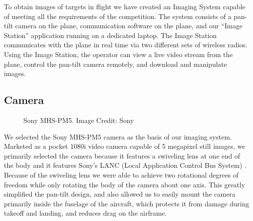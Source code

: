 \documentclass[pdftex,10pt,letter]{article}
\begin{document}
To obtain images of targets in flight we have created an Imaging System capable of meeting all the requirements of the competition.  The system consists of a pan-tilt camera on the plane, communication software on the plane, and our ``Image Station'' application running on a dedicated laptop.  The Image Station communicates with the plane in real time via two different sets of wireless radios.  Using the Image Station, the operator can view a live video stream from the plane, control the pan-tilt camera remotely, and download and manipulate images.

\subsection{Camera}

\begin{figure} [h!]
	\centering
	\caption{Sony MHS-PM5. Image Credit: Sony}
	\label{fig:camera}
\end{figure}

We selected the Sony MHS-PM5 camera as the basis of our imaging system. Marketed as a pocket 1080i video camera capable of 5 megapixel still images, we primarily selected the camera because it features a swiveling lens at one end of the body and it features Sony's LANC (Local Application Control Bus System) \cite{lanc}. Because of the swiveling lens we were able to achieve two rotational degrees of freedom while only rotating the body of the camera about one axis.  This greatly simplified the pan-tilt design, and also allowed us to easily mount the camera primarily inside the fuselage of the aircraft, which protects it from damage during takeoff and landing, and reduces drag on the airframe. 
\end{document}
